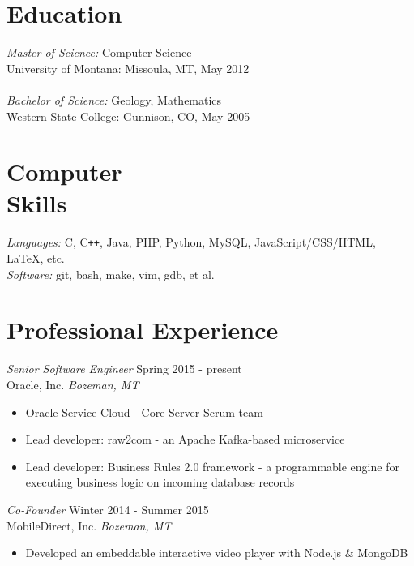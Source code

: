 \documentclass[line,margin]{res}
\begin{document}
\address{\texttt{perry.hooker@gmail.com} | 406.848.1774  }
\address{219 S. Bozeman Ave, Bozeman, MT 59715}
 
\begin{resume}
 
\section{\sc Education} 
        {\sl Master of Science:} Computer Science\\
        University of Montana: Missoula, MT, May 2012\\
        \\
        {\sl Bachelor of Science:} Geology, Mathematics \\
        Western State College: Gunnison, CO, May 2005 \\
 
\section{\sc Computer \\ Skills}
        {\sl Languages:} C, C\verb!++!, Java, PHP, Python, MySQL, JavaScript/CSS/HTML, \LaTeX, etc.\\
        {\sl Software:} git, bash, make, vim, gdb, et al.\\


\section{\sc Professional Experience} 
        {\sl Senior Software Engineer} \hfill  Spring 2015 - present\\
        Oracle, Inc. \hfill {\sl Bozeman, MT}
        \begin{itemize} \itemsep -2pt
            \item Oracle Service Cloud - Core Server Scrum team 
            \item Lead developer: raw2com - an  Apache Kafka-based microservice 
            \item Lead developer: Business Rules 2.0 framework - a programmable engine for executing business logic on incoming database records
        \end{itemize}

        {\sl Co-Founder} \hfill  Winter 2014 - Summer 2015\\
        MobileDirect, Inc. \hfill {\sl Bozeman, MT}
        \begin{itemize} \itemsep -2pt
            \item Developed an embeddable interactive video player with Node.js \& MongoDB
        \end{itemize}


\end{resume}
\end{document}

